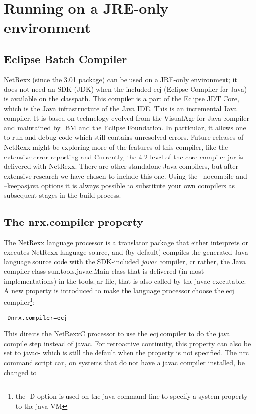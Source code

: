 \chapter{Running on a JRE-only environment}
 
\section{Eclipse Batch Compiler}
NetRexx (since the 3.01 package) can be used on a JRE-only environment; it does not need an SDK (JDK) when the included ecj (Eclipse Compiler for Java) is available on the classpath. This compiler is a part of the Eclipse JDT Core, which is the Java infrastructure of the Java IDE. This is an incremental Java compiler. It is based on technology evolved from the VisualAge for Java compiler and maintained by IBM and the Eclipse Foundation. In particular, it allows one to run and debug code which still contains unresolved errors. Future releases of NetRexx might be exploring more of the features of this compiler, like the extensive error reporting and  Currently, the 4.2 level of the core compiler jar is delivered with NetRexx. There are other standalone Java compilers, but after extensive research we have chosen to include this one. Using the –nocompile and –keepasjava options it is always possible to substitute your own compilers as subsequent stages in the build process.
 
\section{The nrx.compiler property}
The NetRexx language processor is a translator package that either interprets or executes NetRexx language source, and (by default) compiles the generated Java language source code with the SDK-included \emph{javac} compiler, or rather, the Java compiler class sun.tools.javac.Main class that is delivered (in most implementations) in the tools.jar file, that is also called by the javac executable. A new property is introduced to make the language processor choose the ecj compiler\footnote{the -D option is used on the java command line to specify a system property to the java VM}:
 
\begin{verbatim}
-Dnrx.compiler=ecj
\end{verbatim}
 
This directs the NetRexxC processor to use the ecj compiler to do the java compile step instead of javac. For retroactive continuity, this property can also be set to javac- which is still the default when the property is not specified. The nrc command script can, on systems that do not have a javac compiler installed, be changed to
 
